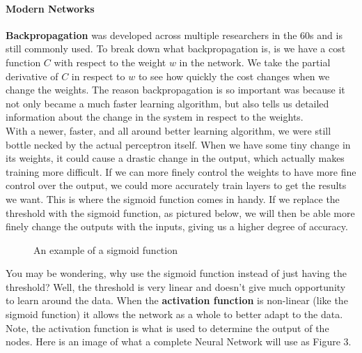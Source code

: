 \documentclass[12pt]{article}
\begin{document}
\paragraph{Modern Networks}
\textbf{Backpropagation} was developed across multiple researchers in the 60s and is still commonly used. To break down what backpropagation is, is we have a cost function $C$ with respect to the weight $w$ in the network. We take the partial derivative of $C$ in respect to $w$ to see how quickly the cost changes when we change the weights. The reason backpropagation is so important was because it not only became a much faster learning algorithm, but also tells us detailed information about the change in the system in respect to the weights.  \\

With a newer, faster, and all around better learning algorithm, we were still bottle necked by the actual perceptron itself. When we have some tiny change in its weights, it could cause a drastic change in the output, which actually makes training more difficult. If we can more finely control the weights to have more fine control over the output, we could more accurately train layers to get the results we want. This is where the sigmoid function comes in handy. If we replace the threshold with the sigmoid function, as pictured below, we will then be able more finely change the outputs with the inputs, giving us a higher degree of accuracy.

\begin{figure}[H]
    \centering
    \def\svgwidth{\columnwidth}
    
    \caption{An example of a sigmoid function}
\end{figure}

You may be wondering, why use the sigmoid function instead of just having the threshold? Well, the threshold is very linear and doesn't give much opportunity to learn around the data. When the \textbf{activation function} is non-linear (like the sigmoid function) it allows the network as a whole to better adapt to the data. Note, the activation function is what is used to determine the output of the nodes. Here is an image of what a complete Neural Network will use as Figure 3.
\end{document}
